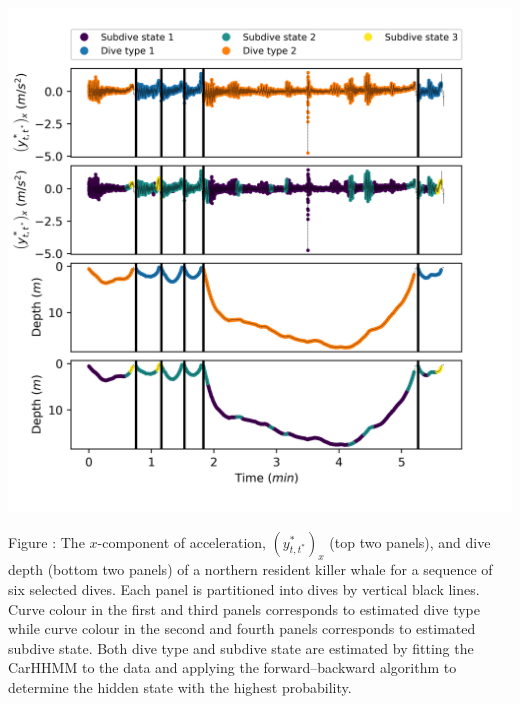 \documentclass{article}
\begin{document}
        \begin{center}
        \includegraphics[width=6in]{../Plots/2019/20190902-182840-CATs_OB_1_0_267_CarHHMM1_decoded_dives.png}
        \end{center}
        
        \noindent Figure : The $x$-component of acceleration, $(y^*_{t,t^*})_x$ (top two panels), and dive depth (bottom two panels) of a northern resident killer whale for a sequence of six selected dives. Each panel is partitioned into dives by vertical black lines. Curve colour in the first and third panels corresponds to estimated dive type while curve colour in the second and fourth panels corresponds to estimated subdive state. Both dive type and subdive state are estimated by fitting the CarHHMM to the data and applying the forward--backward algorithm to determine the hidden state with the highest probability.
        \addtocounter{fignum}{1}
        
\end{document}
